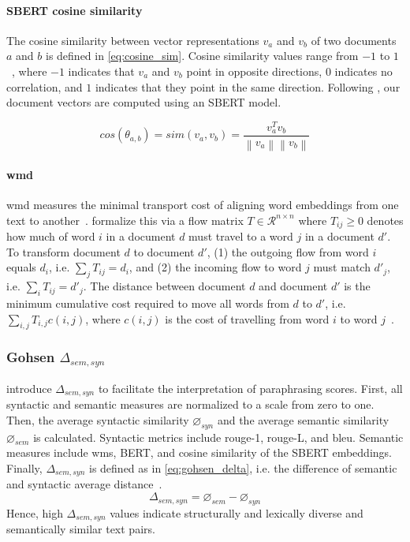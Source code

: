 \paragraph{SBERT cosine similarity}
The cosine similarity between vector representations $v_a$ and $v_b$ of two documents $a$ and $b$ is defined in \autoref{eq:cosine_sim}. 
Cosine similarity values range from $-1$ to $1$~\citep{thongtan_cosine_sim_19,zhang_bertscore_2020}, where $-1$ indicates that $v_a$ and $v_b$ point in opposite directions, $0$ indicates no correlation, and $1$ indicates that they point in the same direction. 
Following \citet{gohsen_captions_2023}, our document vectors are computed using an SBERT model.

\begin{equation}
    cos(\theta_{a,b})=sim(v_a,v_b)=\frac{v_a^Tv_b}{\left\| v_a \right\|\left\| v_b \right\|}
    \label{eq:cosine_sim}
\end{equation}


\paragraph{\ac{wmd}}
\ac{wmd} measures the minimal transport cost of aligning word embeddings from one text to another~\citep{gohsen_captions_2023}. 
\citet{kusner_wmd_15} formalize this via a flow matrix $T \in \mathcal{R}^{n \times n}$ where $T_{ij} \geq 0$ denotes how much of word $i$ in a document $d$ must travel to a word $j$ in a document $d'$.
To transform document $d$ to document $d'$, (1) the outgoing flow from word $i$ equals $d_i$, i.e. $\sum_{j}T_{ij}=d_i$, and (2) the incoming flow to word $j$ must match $d'_j$, i.e. $\sum_{i}T_{ij}=d'_j$.
The distance between document $d$ and document $d'$ is the minimum cumulative cost required to move all words from $d$ to $d'$, i.e. $\sum_{i,j}T_{i,j}c(i,j)$, where $c(i,j)$ is the cost of travelling from word $i$ to word $j$~\citep{kusner_wmd_15}.


\subsubsection{Gohsen $\Delta_{sem,syn}$}

\citet{gohsen_captions_2023} introduce $\Delta_{sem,syn}$ to facilitate the interpretation of paraphrasing scores.
First, all syntactic and semantic measures are normalized to a scale from zero to one.
Then, the average syntactic similarity $\diameter_{syn}$ and the average semantic similarity $\diameter_{sem}$ is calculated.
Syntactic metrics include \ac{rouge}-1, \ac{rouge}-L, and \ac{bleu}.
Semantic measures include \ac{wms}, BERT, and cosine similarity of the SBERT embeddings.
Finally, $\Delta_{sem,syn}$ is defined as in \autoref{eq:gohsen_delta}, i.e. the difference of semantic and syntactic average distance~\citep{gohsen_captions_2023}.
\begin{equation}
    \Delta_{sem,syn}=\diameter_{sem}-\diameter_{syn}
    \label{eq:gohsen_delta}
\end{equation}
Hence, high $\Delta_{sem,syn}$ values indicate structurally and lexically diverse and semantically similar text pairs.
